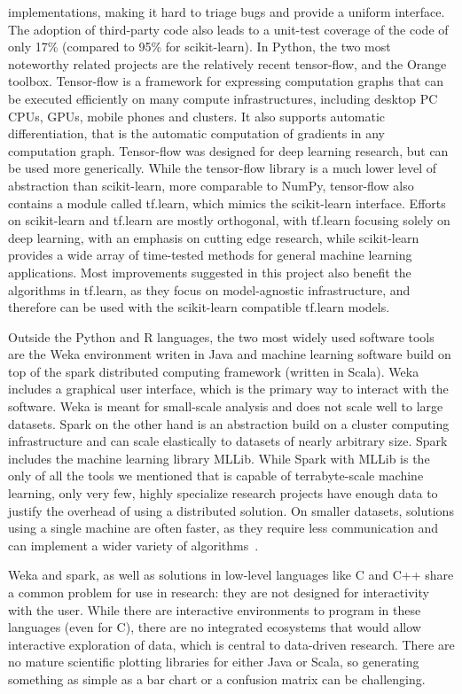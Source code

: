 implementations, making it hard to triage bugs and provide a uniform interface. The
adoption of third-party code also leads to a unit-test coverage of the code of only 17\%
(compared to 95\% for scikit-learn).
In Python, the two most noteworthy related projects are the relatively recent
tensor-flow, and the Orange toolbox. Tensor-flow is a framework for expressing
computation graphs that can be executed efficiently on many compute infrastructures,
including desktop PC CPUs, GPUs, mobile phones and clusters. It also supports
automatic differentiation, that is the automatic computation of gradients in any
computation graph. Tensor-flow was designed for deep learning research, but can be
used more generically. While the tensor-flow library is a much lower level of
abstraction than scikit-learn, more comparable to NumPy, tensor-flow also contains a
module called tf.learn, which mimics the scikit-learn interface. Efforts on scikit-learn
and tf.learn are mostly orthogonal, with tf.learn focusing solely on deep learning, with
an emphasis on cutting edge research, while scikit-learn provides a wide array of
time-tested methods for general machine learning applications. Most improvements
suggested in this project also benefit the algorithms in tf.learn, as they focus on
model-agnostic infrastructure, and therefore can be used with the scikit-learn
compatible tf.learn models.

Outside the Python and R languages, the two most widely used software tools are the
Weka environment writen in Java and machine learning software build on top of the
spark distributed computing framework (written in Scala).
Weka includes a graphical user interface, which is the primary way to interact with
the software. Weka is meant for small-scale analysis and does not scale well to large datasets.
Spark on the other hand is an abstraction build on a cluster computing infrastructure
and can scale elastically to datasets of nearly arbitrary size. Spark includes
the machine learning library MLLib.
While Spark with MLLib is the only of all the tools we mentioned that is capable of
terrabyte-scale machine learning, only very few, highly specialize research projects have
enough data to justify the overhead of using a distributed solution. On smaller
datasets, solutions using a single machine are often faster, as they require less
communication and can implement a wider variety of algorithms~\autocite{rfbench}.

Weka and spark, as well as solutions in low-level languages like C and C++
share a common problem for use in research: they are not designed for interactivity
with the user. While there are interactive environments to program in these
languages (even for C), there are no integrated ecosystems that would allow
interactive exploration of data, which is central to data-driven research.
There are no mature scientific plotting libraries for either Java or Scala, so
generating something as simple as a bar chart or a confusion matrix can be
challenging.


